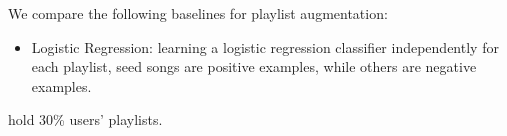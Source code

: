 We compare the following baselines for playlist augmentation:
\begin{itemize}
\item Logistic Regression: learning a logistic regression classifier independently for each playlist,
      seed songs are positive examples, while others are negative examples.
\end{itemize}


\begin{table}[!h]
\centering
\caption{Statistics of dataset for playlist generation for known users}
\label{tab:stats_cold}
\end{table}

hold 30\% users' playlists.
\begin{table}[!h]
\centering
\caption{Statistics of dataset for playlist generation for new users}
\label{tab:stats_cold}
\end{table}



